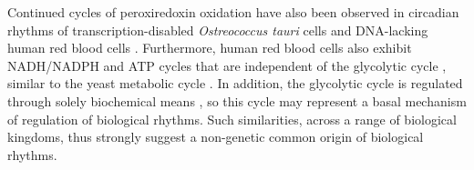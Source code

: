 Continued cycles of peroxiredoxin oxidation have also been observed in circadian rhythms of transcription-disabled \textit{Ostreococcus tauri} cells \parencite{oneillCircadianRhythmsPersist2011} and DNA-lacking human red blood cells \parencite{oneillCircadianClocksHuman2011}.
Furthermore, human red blood cells also exhibit NADH/NADPH and ATP cycles that are independent of the glycolytic cycle \parencite{oneillCircadianClocksHuman2011}, similar to the yeast metabolic cycle \parencite{papagiannakisAutonomousMetabolicOscillations2017}.
In addition, the glycolytic cycle is regulated through solely biochemical means \parencite{ghoshOscillationsGlycolyticIntermediates1964,higginsChemicalMechanismOscillation1964}, so this cycle may represent a basal mechanism of regulation of biological rhythms.
Such similarities, across a range of biological kingdoms, thus strongly suggest a non-genetic common origin of biological rhythms.
